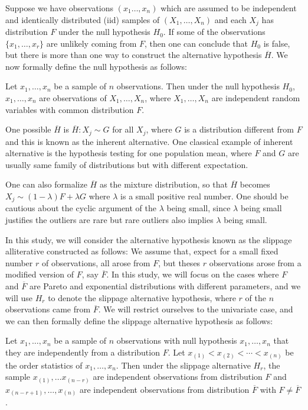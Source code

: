 \documentclass{report}
\begin{document}
Suppose we have observations $(x_1\ldots,x_n)$ which are assumed to be independent and identically distributed (iid) samples of $(X_1,\ldots,X_n)$ and each $X_j$ has distribution $F$ under the null hypothesis $H_0$. 
If some of the observations $\{x_1,\ldots,x_r\}$ are unlikely coming from $F$, then one can conclude that $H_0$ is false, but there is more than one way to
construct the alternative hypothesis $\overline{H}$. We now formally define the null hypothesis as follows:

\begin{defn} \label{defn: H_0}
    Let $x_1,\ldots,x_n$ be a sample of $n$ observations. Then under the null hypothesis $H_0$, $x_1,\ldots,x_n$ are observations of
    $X_1,\ldots,X_n$, where $X_1,\ldots,X_n$ are independent random variables with common distribution $F$.
\end{defn}

One possible $\overline{H}$ is $\overline H : X_j \sim G$ for all $X_j$, where $G$
is a distribution different from $F$ and this is known as the inherent alternative. One classical example of inherent alternative is
the hypothesis testing for one population mean, where $F$ and $G$ are usually same family of distributions but with different expectation.

One can also formalize $\overline H$ as the mixture distribution, so that $\overline H$ becomes $X_j \sim (1-\lambda)F + \lambda G$ where $\lambda$ is a
small positive real number. One should be cautious about the cyclic argument of the $\lambda$ being small, since $\lambda$ being small justifies
the outliers are rare but rare outliers also implies $\lambda$ being small. 

In this study, we will consider the alternative hypothesis known as the slippage alliterative constructed 
as follows: We assume that, expect for a small fixed number $r$ of observations, all arose
from $F$, but theses $r$ observations arose from a modified version of $F$, say $\overline F$. In this study, we will focus on the cases where $F$ and $\overline F$ are Pareto and exponential
distributions with different parameters, and we will use $H_r$ to denote the slippage alternative hypothesis, where $r$ of the $n$ observations came from $\overline F$.
We will restrict ourselves to the univariate case, and we can then formally define the slippage alternative hypothesis as follows:

\begin{defn} \label{defn: slippage Hr}
    Let $x_1,\ldots,x_n$ be a sample of $n$ observations with null hypothesis $x_1,\ldots,x_n$ that they are independently from a distribution $F$. Let
    $x_{(1)} < x_{(2)} <  \cdots < x_{(n)}$ be the order statistics of $x_1,\ldots,x_n$. Then under the slippage alternative $H_r$,
    the sample $x_{(1)},\ldots x_{(n-r)}$ are independent observations from distribution $F$ and $x_{(n-r+1)},\ldots, x_{(n)}$ are independent observations
    from distribution $\overline F$ with $F \neq \overline F$.
\end{defn}
\end{document}
